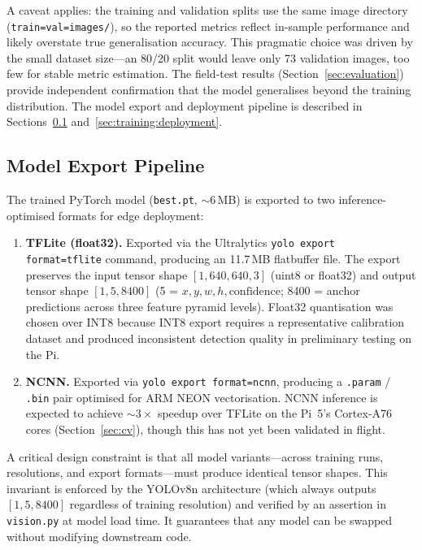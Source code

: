 A caveat applies: the training and validation splits use the same image directory (\texttt{train=val=images/}), so the reported metrics reflect in-sample performance and likely overstate true generalisation accuracy. This pragmatic choice was driven by the small dataset size---an 80/20 split would leave only 73 validation images, too few for stable metric estimation. The field-test results (Section~\ref{sec:evaluation}) provide independent confirmation that the model generalises beyond the training distribution. The model export and deployment pipeline is described in Sections~\ref{sec:training:export} and~\ref{sec:training:deployment}.

\subsection{Model Export Pipeline}\label{sec:training:export}

The trained PyTorch model (\texttt{best.pt}, ${\sim}6$\,MB) is exported to two inference-optimised formats for edge deployment:

\begin{enumerate}
    \item \textbf{TFLite (float32).} Exported via the Ultralytics \texttt{yolo export format=tflite} command, producing an 11.7\,MB flatbuffer file. The export preserves the input tensor shape $[1, 640, 640, 3]$ (uint8 or float32) and output tensor shape $[1, 5, 8400]$ (5 = $x, y, w, h, \text{confidence}$; 8400 = anchor predictions across three feature pyramid levels). Float32 quantisation was chosen over INT8 because INT8 export requires a representative calibration dataset and produced inconsistent detection quality in preliminary testing on the Pi.
    \item \textbf{NCNN.} Exported via \texttt{yolo export format=ncnn}, producing a \texttt{.param} / \texttt{.bin} pair optimised for ARM NEON vectorisation. NCNN inference is expected to achieve ${\sim}3\times$ speedup over TFLite on the Pi~5's Cortex-A76 cores (Section~\ref{sec:cv}), though this has not yet been validated in flight.
\end{enumerate}

A critical design constraint is that all model variants---across training runs, resolutions, and export formats---must produce identical tensor shapes. This invariant is enforced by the YOLOv8n architecture (which always outputs $[1, 5, 8400]$ regardless of training resolution) and verified by an assertion in \texttt{vision.py} at model load time. It guarantees that any model can be swapped without modifying downstream code.

